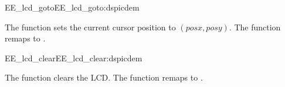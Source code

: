 \begin{function_nopb2}{EE\_lcd\_goto}{EE_lcd_goto:dspicdem}
  
  \begin{fundescription}
    The function sets the current cursor position to $(posx,
    posy)$. The function remaps to .
  \end{fundescription}
  
  \begin{funparameters}
  \end{funparameters}
  
  
\end{function_nopb2}

\begin{function_nopb2}{EE\_lcd\_clear}{EE_lcd_clear:dspicdem}
  
  \begin{fundescription}
    The function clears the LCD. The function remaps to
    .
  \end{fundescription}
  
  
  
\end{function_nopb2}
